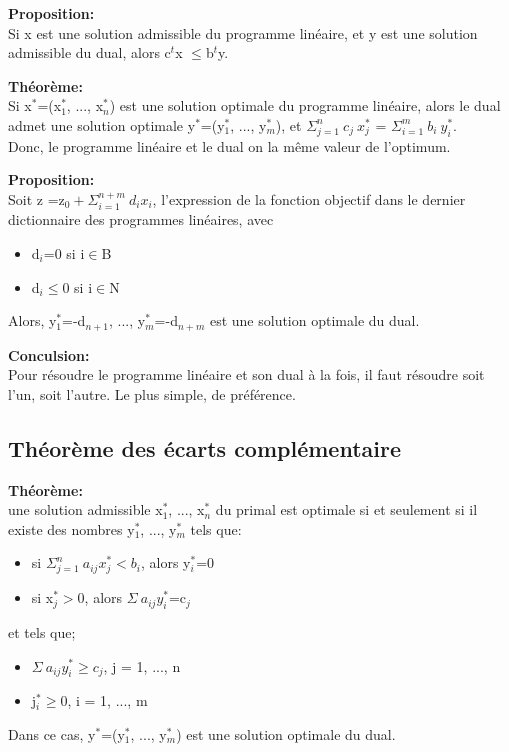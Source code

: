 \textbf{Proposition:\\}
Si x est une solution admissible du programme linéaire, et y est une solution admissible du dual, alors
c$^t$x $\leq$b$^t$y.

\textbf{Théorème:\\}
Si x$^*$=(x$_1^*$, ..., x$_n^*$) est une solution optimale du programme linéaire, alors le dual admet une
solution optimale y$^*$=(y$_1^*$, ..., y$_m^*$), et $\Sigma_{j=1}^n~c_j~x_j^*$ =  $\Sigma_{i=1}^m~b_i~y_i^*$.\\
Donc, le programme linéaire et le dual on la même valeur de l'optimum.

\textbf{Proposition:\\}
Soit z =z$_0+\Sigma_{i=1}^{n+m}~d_ix_i$, l'expression de la fonction objectif dans le dernier dictionnaire des
programmes linéaires, avec
\begin{itemize}
	\item d$_i$=0 si i$\in$B
	\item d$_i\leq$0 si i$\in$N
\end{itemize}
Alors, y$_1^*$=-d$_{n+1}$, ..., y$_m^*$=-d$_{n+m}$ est une solution optimale du dual.

\textbf{Conculsion:\\}
Pour résoudre le programme linéaire et son dual à la fois, il faut résoudre soit l'un, soit l'autre. Le plus simple,
de préférence.

\subsection{Théorème des écarts complémentaire}
\textbf{Théorème:\\}
une solution admissible x$_1^*$, ..., x$_n^*$ du primal est optimale si et seulement si il existe des nombres
y$_1^*$, ..., y$_m^*$ tels que:
\begin{itemize}
	\item si $\Sigma_{j=1}^n~a_{ij}x_j^*<b_i$, alors y$_i^*$=0
	\item si x$_j^*>$0, alors $\Sigma~a_{ij}y_i^*$=c$_j$
\end{itemize}
et tels que;
\begin{itemize}
	\item $\Sigma~a_{ij}y_i^* \geq c_j$, j = 1, ..., n
	\item j$_i^*\geq$0, i = 1, ..., m
\end{itemize}
Dans ce cas, y$^*$=(y$_1^*$, ..., y$_m^*$) est une solution optimale du dual.

